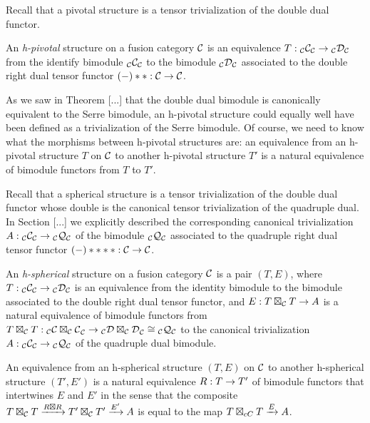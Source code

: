 \documentclass{amsart}
\begin{document}
Recall that a pivotal structure is a tensor trivialization of the double dual functor.

\begin{definition}
An \emph{h-pivotal} structure on a fusion category $\mathcal C$ is an equivalence $T: {}_{\mathcal C} {\mathcal C}_{\mathcal C} \rightarrow {}_{\mathcal C} {\mathcal D}_{\mathcal C}$ from the identify bimodule ${}_{\mathcal C} {\mathcal C}_{\mathcal C}$ to the bimodule ${}_{\mathcal C} {\mathcal D}_{\mathcal C}$ associated to the double right dual tensor functor $(-)**: \mathcal C \rightarrow \mathcal C$.  
\end{definition}

\nid As we saw in Theorem [...] that the double dual bimodule is canonically equivalent to the Serre bimodule, an h-pivotal structure could equally well have been defined as a trivialization of the Serre bimodule.  Of course, we need to know what the morphisms between h-pivotal structures are: an equivalence from an h-pivotal structure $T$ on $\mathcal C$ to another h-pivotal structure $T'$ is a natural equivalence of bimodule functors from $T$ to $T'$.

Recall that a spherical structure is a tensor trivialization of the double dual functor whose double is the canonical tensor trivialization of the quadruple dual.  In Section [...] we explicitly described the corresponding canonical trivialization $A : {}_{\mathcal C} {\mathcal C}_{\mathcal C} \rightarrow {}_{\mathcal C} {\mathcal Q}_{\mathcal C}$ of the bimodule ${}_{\mathcal C} {\mathcal Q}_{\mathcal C}$ associated to the quadruple right dual tensor functor $(-)****: \mathcal C \rightarrow \mathcal C$. 

\begin{definition}
An \emph{h-spherical} structure on a fusion category $\mathcal C$ is a pair $(T,E)$, where $T: {}_{\mathcal C} {\mathcal C}_{\mathcal C} \rightarrow {}_{\mathcal C} {\mathcal D}_{\mathcal C}$ is an equivalence from the identity bimodule to the bimodule associated to the double right dual tensor functor, and $E: T \boxtimes_{\mathcal C} T \rightarrow A$ is a natural equivalence of bimodule functors from $T \boxtimes_{\mathcal C} T: {}_{\mathcal C} {\mathcal C \boxtimes_{\mathcal C} \mathcal C}_{\mathcal C} \rightarrow {}_{\mathcal C} {\mathcal D \boxtimes_{\mathcal C} \mathcal D}_{\mathcal C} \cong {}_{\mathcal C} {\mathcal Q}_{\mathcal C}$ to the canonical trivialization $A : {}_{\mathcal C} {\mathcal C}_{\mathcal C} \rightarrow {}_{\mathcal C} {\mathcal Q}_{\mathcal C}$ of the quadruple dual bimodule.
\end{definition}

An equivalence from an h-spherical structure $(T,E)$ on $\mathcal C$ to another h-spherical structure $(T',E')$ is a natural equivalence $R: T \rightarrow T'$ of bimodule functors that intertwines $E$ and $E'$ in the sense that the composite $T \boxtimes_{\mathcal C} T \xrightarrow{R \boxtimes R} T' \boxtimes_{\mathcal C} T' \xrightarrow{E'} A$ is equal to the map $T \boxtimes_{cC} T \xrightarrow{E} A$.
\end{document}
